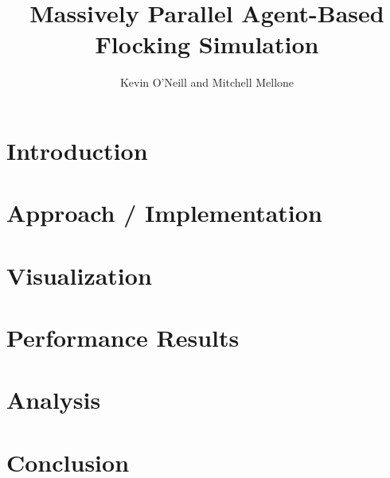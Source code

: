 \documentclass[10pt, twocolumn]{article}
\title{Massively Parallel Agent-Based Flocking Simulation}
\author{Kevin O'Neill and Mitchell Mellone}
\date{}
\begin{document}
\maketitle

\begin{abstract}
  
\end{abstract}

\section*{Introduction}


\section*{Approach / Implementation}


\section*{Visualization}


\section*{Performance Results}


\section*{Analysis}


\section*{Conclusion}


\printbibliography[title=References]
\end{document}
